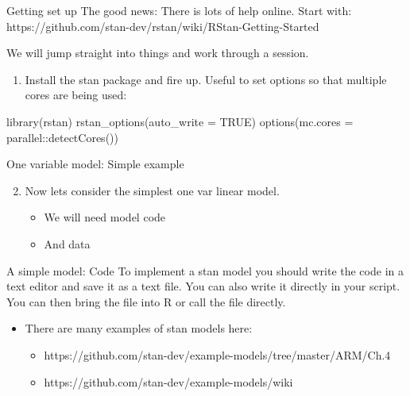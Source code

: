 \documentclass[
  11pt,
  ignorenonframetext,
]{beamer}
\newenvironment{Shaded}{\begin{snugshade}}{\end{snugshade}}
\newcommand{\AttributeTok}[1]{\textcolor[rgb]{0.40,0.45,0.13}{#1}}
\newcommand{\ConstantTok}[1]{\textcolor[rgb]{0.56,0.35,0.01}{#1}}
\newcommand{\FunctionTok}[1]{\textcolor[rgb]{0.28,0.35,0.67}{#1}}
\newcommand{\NormalTok}[1]{\textcolor[rgb]{0.00,0.23,0.31}{#1}}
\newcommand{\SpecialCharTok}[1]{\textcolor[rgb]{0.37,0.37,0.37}{#1}}
\providecommand{\tightlist}{%
  \setlength{\itemsep}{0pt}\setlength{\parskip}{0pt}}\usepackage{longtable,booktabs,array}
\begin{document}
\begin{frame}[fragile]{Getting set up}
\protect\hypertarget{getting-set-up}{}
The good news: There is lots of help online. Start with:
https://github.com/stan-dev/rstan/wiki/RStan-Getting-Started

We will jump straight into things and work through a session.

\begin{enumerate}
\tightlist
\item
  Install the stan package and fire up. Useful to set options so that
  multiple cores are being used:
\end{enumerate}

\begin{Shaded}
\begin{Highlighting}[]
\FunctionTok{library}\NormalTok{(rstan)}
\FunctionTok{rstan\_options}\NormalTok{(}\AttributeTok{auto\_write =} \ConstantTok{TRUE}\NormalTok{)}
\FunctionTok{options}\NormalTok{(}\AttributeTok{mc.cores =}\NormalTok{ parallel}\SpecialCharTok{::}\FunctionTok{detectCores}\NormalTok{())}
\end{Highlighting}
\end{Shaded}
\end{frame}

\begin{frame}{One variable model: Simple example}
\protect\hypertarget{one-variable-model-simple-example}{}
\begin{enumerate}
\setcounter{enumi}{1}
\tightlist
\item
  Now lets consider the simplest one var linear model.

  \begin{itemize}
  \tightlist
  \item
    We will need model code
  \item
    And data
  \end{itemize}
\end{enumerate}
\end{frame}

\begin{frame}{A simple model: Code}
\protect\hypertarget{a-simple-model-code}{}
To implement a stan model you should write the code in a text editor and
save it as a text file. You can also write it directly in your script.
You can then bring the file into R or call the file directly.

\begin{itemize}
\tightlist
\item
  There are many examples of stan models here:

  \begin{itemize}
  \tightlist
  \item
    https://github.com/stan-dev/example-models/tree/master/ARM/Ch.4
  \item
    https://github.com/stan-dev/example-models/wiki
  \end{itemize}
\end{itemize}
\end{frame}
\end{document}
